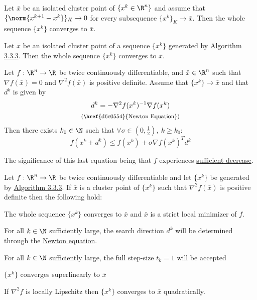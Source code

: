 Let $\bar x$ be an isolated cluster point of $\{x^k\in\R^n\}$ and assume that
$\{\norm{x^{k+1}-x^k}\}_K\to0$ for every subsequence $\{x^k\}_K\to\bar x$. Then
the whole sequence $\{x^k\}$ converges to $\bar x$.

\label{aabc89a}

Let $\bar x$ be an isolated cluster point of a sequence $\{x^k\}$ generated by
\href{a7a5665}{Algorithm 3.3.3}. Then the whole sequence $\{x^k\}$ converges to
$\bar x$.

\label{d6d6148}

Let $f:\R^n\to\R$ be twice continuously differentiable, and $\bar x\in\R^n$
such that $\nabla f(\bar x)=0$ and $\nabla^2f(\bar x)$ is positive definite.
Assume that $\{x^k\}\to\bar x$ and that $d^k$ is given by
\begin{gather*}
  d^k = -\nabla^2f(x^k)^{-1}\nabla f(x^k) \\
  \text{\footnotesize{(\href{d6c0554}{Newton Equation})}}
\end{gather*}
Then there exists $k_0\in\N$ such that $\forall\sigma\in(0,\frac12),\ k\geq k_0$:
$$
  f(x^k+d^k)\leq f(x^k)+\sigma\nabla f(x^k)^Td^k
$$

The significance of this last equation being that $f$ experiences
\href{fefb024}{sufficient decrease}.

\label{e58830c}

Let $f:\R^n\to\R$ be twice continuously differentiable and let $\{x^k\}$ be
generated by \href{a7a5665}{Algorithm 3.3.3}. If $\bar x$ is a cluster point of
$\{x^k\}$ such that $\nabla^2f(\bar x)$ is positive definite then the following
hold:
\begin{enumerata}
  \item The whole sequence $\{x^k\}$ converges to $\bar x$ and $\bar x$ is a strict
  local minimizer of $f$.
  \item For all $k\in\N$ sufficiently large, the search direction $d^k$ will be
  determined through the \href{d6c0554}{Newton equation}.
  \item For all $k\in\N$ sufficiently large, the full step-size $t_k=1$ will be
  accepted
  \item $\{x^k\}$ converges superlinearly to $\bar x$
  \item If $\nabla^2f$ is locally Lipschitz then $\{x^k\}$ converges to $\bar x$
  quadratically.
\end{enumerata}

